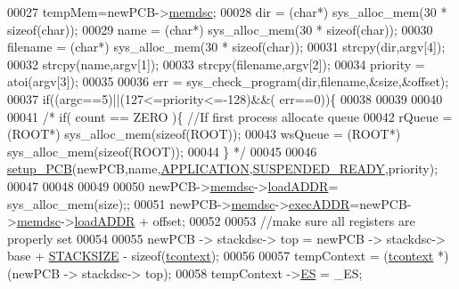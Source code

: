 \begin{DoxyCode}
00027         tempMem=newPCB->\hyperlink{structprocess_a163551ab7b60184b48e5d440fcd5c2b8}{memdsc};
00028         dir = (\textcolor{keywordtype}{char}*) sys\_alloc\_mem(30 * \textcolor{keyword}{sizeof}(\textcolor{keywordtype}{char}));
00029         name = (\textcolor{keywordtype}{char}*) sys\_alloc\_mem(30 * \textcolor{keyword}{sizeof}(\textcolor{keywordtype}{char}));
00030         filename = (\textcolor{keywordtype}{char}*) sys\_alloc\_mem(30 * \textcolor{keyword}{sizeof}(\textcolor{keywordtype}{char}));
00031         strcpy(dir,argv[4]);
00032         strcpy(name,argv[1]);
00033         strcpy(filename,argv[2]);
00034         priority = atoi(argv[3]);
00035         
00036         err = sys\_check\_program(dir,filename,&size,&offset);
00037         \textcolor{keywordflow}{if}((argc==5)||(127<=priority<=-128)&&( err==0))\{
00038                 
00039                 
00040 
00041               \textcolor{comment}{/*        if( count == ZERO )\{ //If first process allocate queue}
00042 \textcolor{comment}{                        rQueue = (ROOT*) sys\_alloc\_mem(sizeof(ROOT));}
00043 \textcolor{comment}{                        wsQueue = (ROOT*) sys\_alloc\_mem(sizeof(ROOT));}
00044 \textcolor{comment}{                \}   */}
00045 
00046                 \hyperlink{mpx__r2_8c_a316c9619aba53c03c17afbc0a0dbf096}{setup_PCB}(newPCB,name,\hyperlink{mpx__r2_8h_a796bd7c6ba2e59281760fb155c6287e8}{APPLICATION},\hyperlink{mpx__r2_8h_a07b1141143e8825b04670da23fca8cc7}{SUSPENDED_READY},priority);
00047 
00048 
00049                 
00050                 newPCB->\hyperlink{structprocess_a163551ab7b60184b48e5d440fcd5c2b8}{memdsc}->\hyperlink{structmem_a8f5a4db03ee0560e6bd4dd602ad753c0}{loadADDR}= sys\_alloc\_mem(size);;
00051                 newPCB->\hyperlink{structprocess_a163551ab7b60184b48e5d440fcd5c2b8}{memdsc}->\hyperlink{structmem_a5340491e17307817e6dca3b1d260d18a}{execADDR}=newPCB->\hyperlink{structprocess_a163551ab7b60184b48e5d440fcd5c2b8}{memdsc}->\hyperlink{structmem_a8f5a4db03ee0560e6bd4dd602ad753c0}{loadADDR} + offset;
00052                 
00053                 \textcolor{comment}{//make sure all registers are properly set}
00054                 
00055                 newPCB -> stackdsc-> top = newPCB -> stackdsc-> base + \hyperlink{mpx__r2_8h_a21d9543c516fffee84a7963224271f95}{STACKSIZE} 
      - \textcolor{keyword}{sizeof}(\hyperlink{structcontext}{tcontext});
00056                 
00057                 tempContext = (\hyperlink{structcontext}{tcontext} *) (newPCB -> stackdsc-> top);
00058                 tempContext ->\hyperlink{structcontext_a81a78fef7bda3a5dd852b28a905890ab}{ES} = \_ES;

\end{DoxyCode}
